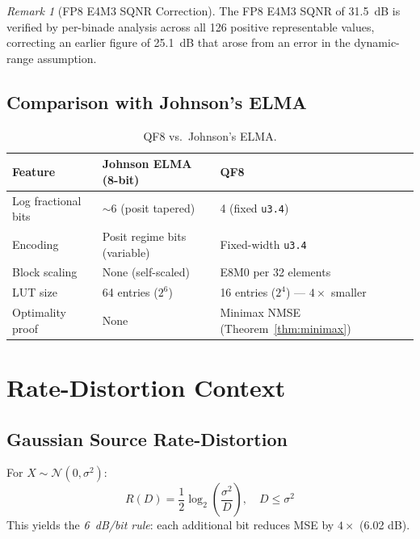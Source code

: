 \documentclass[11pt,letterpaper]{article}
\theoremstyle{definition}
\theoremstyle{remark}
\newtheorem{remark}[theorem]{Remark}
\begin{document}
\begin{remark}[FP8 E4M3 SQNR Correction]
The FP8 E4M3 SQNR of 31.5~dB is verified by per-binade analysis across all
126 positive representable values, correcting an earlier figure of 25.1~dB that
arose from an error in the dynamic-range assumption.
\end{remark}

\subsection{Comparison with Johnson's ELMA}
\label{subsec:vs-johnson}

\begin{table}[ht]
\centering
\caption{QF8 vs.\ Johnson's ELMA.}
\label{tab:vs-johnson}
\begin{tabular}{@{}p{3.5cm}p{5cm}p{5cm}@{}}
\toprule
Feature & Johnson ELMA (8-bit) & QF8 \\
\midrule
Log fractional bits  & $\sim$6 (posit tapered)     & 4 (fixed \texttt{u3.4}) \\
Encoding             & Posit regime bits (variable) & Fixed-width \texttt{u3.4} \\
Block scaling        & None (self-scaled)           & E8M0 per 32 elements \\
LUT size             & 64 entries ($2^6$)
  & 16 entries ($2^4$) --- $4\times$ smaller \\
Optimality proof     & None
  & Minimax NMSE (Theorem~\ref{thm:minimax}) \\
\bottomrule
\end{tabular}
\end{table}


\section{Rate-Distortion Context}
\label{sec:appendix-rd}

\subsection{Gaussian Source Rate-Distortion}

For $X \sim \mathcal{N}(0, \sigma^2)$:
\[
  R(D) = \frac{1}{2}\log_2\!\left(\frac{\sigma^2}{D}\right),
  \quad D \leq \sigma^2
\]
This yields the \emph{6~dB/bit rule}: each additional bit reduces MSE by
$4\times$ (6.02 dB).
\end{document}
